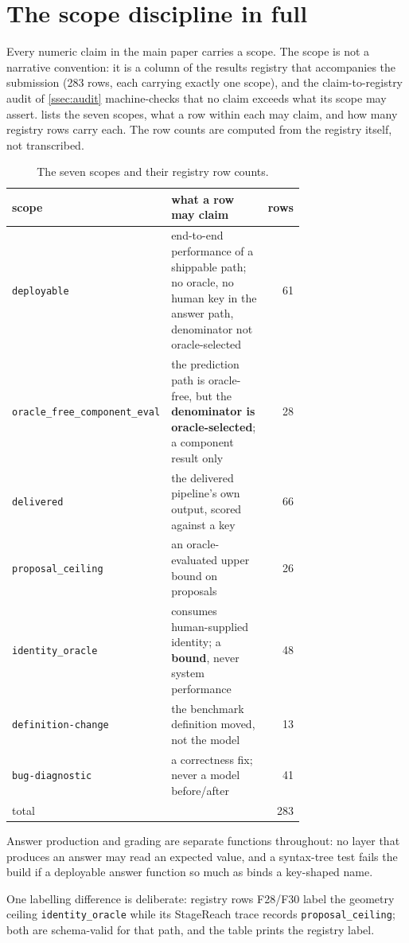 \section{The scope discipline in full}
\label{ssec:scopes}

Every numeric claim in the main paper carries a scope. The scope is not a
narrative convention: it is a column of the results registry that accompanies
the submission (283 rows, each carrying exactly one scope), and the
claim-to-registry audit of \cref{ssec:audit} machine-checks that no claim
exceeds what its scope may assert.  lists the seven scopes,
what a row within each may claim, and how many registry rows carry each. The
row counts are computed from the registry itself, not transcribed.

\begin{table}[t]
  \centering\footnotesize
  \setlength{\tabcolsep}{3pt}
  \begin{tabular}{@{}p{0.30\linewidth}p{0.43\linewidth}r@{}}
    \toprule
    scope & what a row may claim & rows\\
    \midrule
    \texttt{deployable} & end-to-end performance of a shippable path; no
      oracle, no human key in the answer path, denominator not
      oracle-selected & 61\\
    \texttt{oracle\_free\_\allowbreak component\_\allowbreak eval} & the prediction path is
      oracle-free, but the \textbf{denominator is oracle-selected}; a
      component result only & 28\\
    \texttt{delivered} & the delivered pipeline's own output, scored against
      a key & 66\\
    \texttt{proposal\_ceiling} & an oracle-evaluated upper bound on
      proposals & 26\\
    \texttt{identity\_oracle} & consumes human-supplied identity; a
      \textbf{bound}, never system performance & 48\\
    \texttt{definition-change} & the benchmark definition moved, not the
      model & 13\\
    \texttt{bug-diagnostic} & a correctness fix; never a model
      before/after & 41\\
    \midrule
    total & & 283\\
    \bottomrule
  \end{tabular}
  \caption{The seven scopes and their registry row counts.}
  \label{tab:scopes}
\end{table}

Answer production and grading are separate functions throughout: no layer
that produces an answer may read an expected value, and a syntax-tree test
fails the build if a deployable answer function so much as binds a
key-shaped name.

One labelling difference is deliberate: registry rows F28/F30 label the
geometry ceiling \texttt{identity\_oracle} while its StageReach trace records
\texttt{proposal\_ceiling}; both are schema-valid for that path, and the
table prints the registry label.
